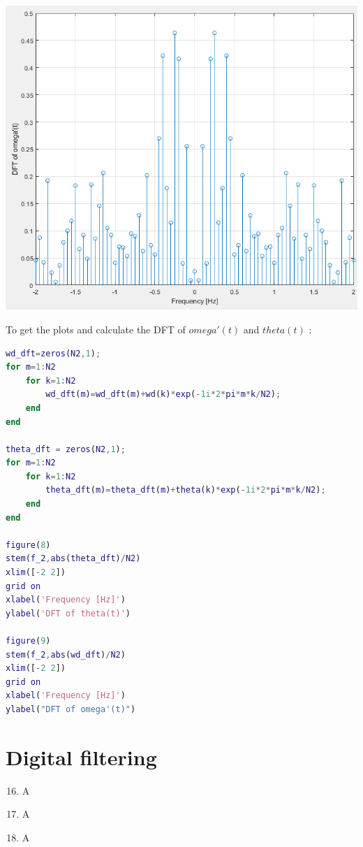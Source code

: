 \documentclass[a4paper,12pt]{article}
\begin{document}
\begin{enumerate}[label={\color{blue}\arabic*)}]
\begin{multicols}{2}
\begin{flushright}
            \includegraphics[width=1\linewidth]{Images/DFT_omega_dot.png}
            \label{Figure11}
        \end{flushright}
        
    \end{multicols}
    To get the plots and calculate the DFT of \(omega'(t)\) and \(theta(t)\) :
    \begin{lstlisting}[style=Matlab-editor,language=Matlab, basicstyle=\small\ttfamily]
wd_dft=zeros(N2,1);
for m=1:N2
    for k=1:N2
        wd_dft(m)=wd_dft(m)+wd(k)*exp(-1i*2*pi*m*k/N2);
    end
end

theta_dft = zeros(N2,1);
for m=1:N2
    for k=1:N2
        theta_dft(m)=theta_dft(m)+theta(k)*exp(-1i*2*pi*m*k/N2);
    end
end

figure(8)
stem(f_2,abs(theta_dft)/N2)
xlim([-2 2])
grid on
xlabel('Frequency [Hz]')
ylabel('DFT of theta(t)')

figure(9)
stem(f_2,abs(wd_dft)/N2)
xlim([-2 2])
grid on
xlabel('Frequency [Hz]')
ylabel("DFT of omega'(t)")
        \end{lstlisting}

\end{enumerate}

\newpage
\section{Digital filtering}

\begin{enumerate}[label={\color{blue}\arabic*)}]
    \setcounter{enumi}{15}

    \item
    A

    \item
    A

    \item
    A

\end{enumerate}
\end{document}
